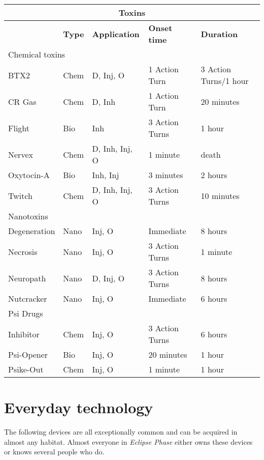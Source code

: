\begin{table}

\begin{tabular}{|l|l|l|l|l|}
\hline
\multicolumn{5}{|c|}{\textbf{Toxins}} \\
\hline
 			& \textbf{Type}	& \textbf{Application}	& \textbf{Onset time}	& \textbf{Duration} \\
\hline
\multicolumn{5}{|l|}{Chemical toxins} \\
\hline
BTX2			& Chem				& D, Inj, O			& 1 Action Turn		& 3 Action Turns/1 hour \\
\hline
CR Gas		& Chem				& D, Inh				& 1 Action Turn		& 20 minutes \\
\hline
Flight		& Bio				& Inh				& 3 Action Turns		& 1 hour \\
\hline
Nervex		& Chem				& D, Inh, Inj, O		& 1 minute			& death \\
\hline
Oxytocin-A	& Bio				& Inh, Inj			& 3 minutes			& 2 hours \\
\hline
Twitch		& Chem				& D, Inh, Inj, O		& 3 Action Turns		& 10 minutes \\
\hline
\multicolumn{5}{|l|}{Nanotoxins} \\
\hline
Degeneration	& Nano			& Inj, O				& Immediate			& 8 hours \\
\hline
Necrosis		& Nano			& Inj, O				& 3 Action Turns		& 1 minute \\
\hline
Neuropath		& Nano			& D, Inj, O			& 3 Action Turns		& 8 hours \\
\hline
Nutcracker	& Nano			& Inj, O				& Immediate			& 6 hours \\
\hline
\multicolumn{5}{|l|}{Psi Drugs} \\
\hline
Inhibitor		& Chem			& Inj, O				& 3 Action Turns		& 6 hours \\
\hline
Psi-Opener	& Bio			& Inj, O				& 20 minutes			& 1 hour \\
\hline
Psike-Out		& Chem			& Inj, O				& 1 minute			& 1 hour \\
\hline
\end{tabular}
\label{tab:Toxins}
\end{table}


\section{Everyday technology}
\label{sec:everyday-tech}

The following devices are all exceptionally common and can be acquired in almost any habitat. Almost everyone in \emph{Eclipse Phase} either owns these devices or knows several people who do.

